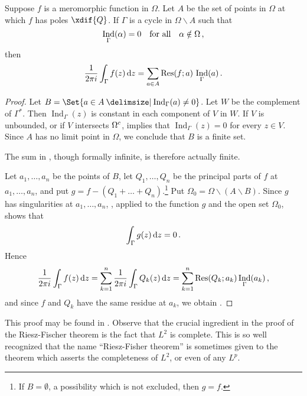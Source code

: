 \documentclass[12pt, ThmSectionNumbering]{CrispyNotes}
\DeclareMathOperator{\Ind}{Ind}
\DeclareMathOperator{\Res}{Res}
\begin{document}
\begin{theorem}
    Suppose $f$ is a meromorphic function in $\Omega$. Let $A$ be the set of points in $\Omega$ at which $f$ has poles $\xdif{Q}$. If $\Gamma$ is a cycle in $\Omega\smallsetminus A$ such that
        \begin{equation}\label{eq1}
            \Ind_\Gamma (\alpha) = 0 \quad \text{for all} \quad \alpha\notin\Omega\mathc
        \end{equation}
    then
        \begin{equation}\label{eq12}
            \frac{1}{2\pi i}\int_{\Gamma} f(z)\odif{z} = \sum_{a\in A} \Res(f; a)\, \Ind_\Gamma (a)\mathp
        \end{equation}
\end{theorem}
\begin{proof}
    Let $B = \Set{a \in A \given \Ind_{\Gamma}(a)\neq 0}$. Let $W$ be the complement of $\Gamma^*$. Then $\Ind_{\Gamma}(z)$ is constant in each component of $V$ in $W$. If $V$ is unbounded, or if $V$ intersects ${\Omega}^{c}$,  implies that $\Ind_{\Gamma}(z)=0$ for every $z\in V$. Since $A$ has no limit point in $\Omega$, we conclude that $B$ is a finite set.

    The sum in , though formally infinite, is therefore actually finite.

    Let $a_1, \ldots, a_n$ be the points of $B$, let $Q_1, \ldots, Q_n$ be the principal parts of $f$ at $a_1, \ldots, a_n$, and put $g=f-(Q_1+\dots+Q_n)$.\footnote{If $B=\emptyset$, a possibility which is not excluded, then $g=f$.} Put $\Omega_0= \Omega\smallsetminus(A\smallsetminus B)$. Since $g$ has singularities at $a_1, \ldots, a_n$, , applied to the function $g$ and the open set $\Omega_0$, shows that 
        \begin{equation}\label{d}
            \int_{\Gamma} g(z) \odif{z} = 0\mathp
        \end{equation}
    Hence
        \begin{equation}\label{d2}
          \frac{1}{2\pi i}\int_{\Gamma} f(z)\odif{z} = \sum_{k=1}^{n}\frac{1}{2\pi i}\int_{\Gamma} Q_k(z) \odif{z} = \sum_{k=1}^{n}\Res(Q_k; a_k)\Ind_{\Gamma}(a_k)\mathc
        \end{equation}
    and since $f$ and $Q_k$ have the same residue at $a_k$, we obtain .
\end{proof}

This proof may be found in \cite{rudinRealComplexAnalysis1986}. Observe that the crucial ingredient in the proof of the Riesz-Fischer theorem is the fact that $L^2$ is complete. This is so well recognized that the name \enquote{Riesz-Fisher theorem} is sometimes given to the theorem which asserts the completeness of $L^2$, or even of any $L^p$.
\end{document}
